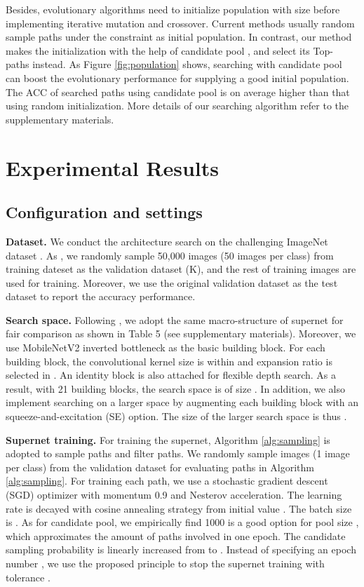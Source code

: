 \documentclass[10pt,twocolumn,letterpaper]{article}
\begin{document}
Besides, evolutionary algorithms need to initialize population with size  before implementing iterative mutation and crossover. Current methods usually random sample  paths under the constraint as initial population. In contrast, our method makes the initialization with the help of candidate pool , and select its Top- paths instead. As Figure \ref{fig:population} shows, searching with candidate pool can boost the evolutionary performance for supplying a good initial population. The ACC of searched paths using candidate pool is on average higher than that using random initialization. More details of our searching algorithm refer to the supplementary materials. 



\section{Experimental Results} 



\subsection{Configuration and settings}
\textbf{Dataset.} We conduct the architecture search on the challenging ImageNet dataset \cite{imagenet}. As \cite{proxylessnas}, we randomly sample 50,000 images (50 images per class) from training dateset as the validation dataset (K), and the rest of training images are used for training. Moreover, we use the original validation dataset as the test dataset to report the accuracy performance. 

\textbf{Search space.} Following \cite{proxylessnas,fairnas}, we adopt the same macro-structure of supernet for fair comparison as shown in Table 5 (see supplementary materials). Moreover, we use MobileNetV2 inverted bottleneck \cite{mobilenetv2} as the basic building block. For each building block, the convolutional kernel size is within  and expansion ratio is selected in . An identity block is also attached for 
flexible depth search. As a result, with 21 building blocks, the search space is of size . In addition, we also implement searching on a larger space by augmenting each building block with an squeeze-and-excitation (SE) option. The size of the larger search space is thus . 

\textbf{Supernet training.} For training the supernet, Algorithm \ref{alg:sampling} is adopted to sample  paths and filter  paths. We randomly sample  images  (1 image per class) from the validation dataset for evaluating paths in Algorithm \ref{alg:sampling}. For training each path, we use a stochastic gradient descent (SGD) optimizer with momentum 0.9 and Nesterov acceleration. The learning rate is decayed with cosine annealing strategy from initial value . The batch size is . As for candidate pool, we empirically find 1000 is a good option for pool size , which approximates the amount of paths involved in one epoch. The candidate sampling probability  is linearly increased from  to . Instead of specifying an epoch number \cite{face++,fairnas},  we use the proposed principle to stop the supernet training with tolerance .  
\end{document}
